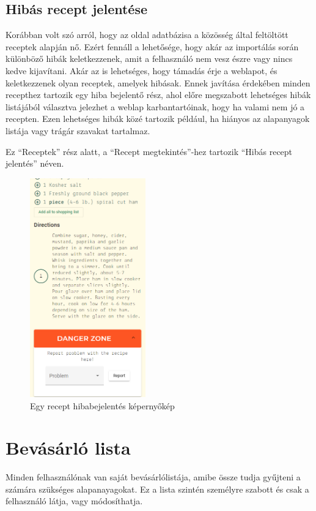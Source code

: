 \documentclass[12pt]{report}
\theoremstyle{definition}
\begin{document}
\subsection{Hibás recept jelentése}
Korábban volt szó arról, hogy az oldal adatbázisa a közösség által feltöltött receptek alapján nő. Ezért fennáll a lehetősége, hogy akár az importálás során különböző hibák keletkezzenek, amit a felhasználó nem vesz észre vagy nincs kedve kijavítani. Akár az is lehetséges, hogy támadás érje a weblapot, és keletkezzenek olyan receptek, amelyek hibásak. Ennek javítása érdekében minden recepthez tartozik egy hiba bejelentő rész, ahol előre megszabott lehetséges hibák listájából választva jelezhet a weblap karbantartóinak, hogy ha valami nem jó a recepten. Ezen lehetséges hibák közé tartozik például, ha hiányos az alapanyagok listája vagy trágár szavakat tartalmaz.

Ez  “Receptek” rész alatt, a “Recept megtekintés”-hez tartozik “Hibás recept jelentés” néven.

\begin{figure}[H]%
    \centering
    \includegraphics[width=5cm]{pictures/mobile-report.png}
	\caption{Egy recept hibabejelentés képernyőkép}%
    \label{fig:report}%
\end{figure}


\section{Bevásárló lista}
Minden felhasználónak van saját bevásárlólistája, amibe össze tudja gyűjteni a számára szükséges alapanayagokat. Ez a lista szintén személyre szabott és csak a felhasználó látja, vagy módosíthatja.
\end{document}
